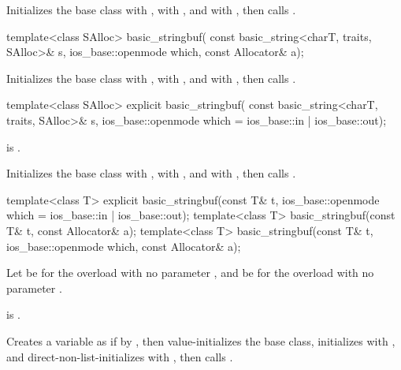 \begin{itemdescr}
\pnum
\effects
Initializes the base class with ,
 with , and
 with ,
then calls .
\end{itemdescr}

%
\begin{itemdecl}
template<class SAlloc>
  basic_stringbuf(
    const basic_string<charT, traits, SAlloc>& s,
    ios_base::openmode which, const Allocator& a);
\end{itemdecl}

\begin{itemdescr}
\pnum
\effects
Initializes the base class with ,
 with , and
 with ,
then calls .
\end{itemdescr}

%
\begin{itemdecl}
template<class SAlloc>
  explicit basic_stringbuf(
    const basic_string<charT, traits, SAlloc>& s,
    ios_base::openmode which = ios_base::in | ios_base::out);
\end{itemdecl}

\begin{itemdescr}
\pnum
\constraints
{} is .

\pnum
\effects
Initializes the base class with ,
 with , and
 with ,
then calls .
\end{itemdescr}

%
\begin{itemdecl}
template<class T>
  explicit basic_stringbuf(const T& t, ios_base::openmode which = ios_base::in | ios_base::out);
template<class T>
  basic_stringbuf(const T& t, const Allocator& a);
template<class T>
  basic_stringbuf(const T& t, ios_base::openmode which, const Allocator& a);
\end{itemdecl}

\begin{itemdescr}
\pnum
Let  be 
for the overload with no parameter , and
 be  for the overload with no parameter .

\pnum
\constraints
{}
is .

\pnum
\effects
Creates a variable  as if by
,
then value-initializes the base class,
initializes  with , and
direct-non-list-initializes  with ,
then calls .
\end{itemdescr}

